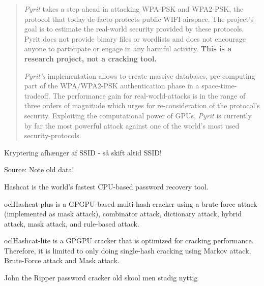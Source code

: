 \documentclass[20pt,landscape,a4paper,footrule]{foils}
\begin{document}

\begin{quote}
\emph{Pyrit} takes a step ahead in attacking WPA-PSK and WPA2-PSK, the protocol that today de-facto protects public WIFI-airspace. The project's goal is to estimate the real-world security provided by these protocols. Pyrit does not provide binary files or wordlists and does not encourage anyone to participate or engage in any harmful activity. {\bf This is a research project, not a cracking tool.}

\emph{Pyrit's} implementation allows to create massive databases, pre-computing part of the WPA/WPA2-PSK authentication phase in a space-time-tradeoff. The performance gain for real-world-attacks is in the range of three orders of magnitude which urges for re-consideration of the protocol's security. Exploiting the computational power of GPUs, \emph{Pyrit} is currently by far the most powerful attack against one of the world's most used security-protocols.
\end{quote}

\begin{list1}
\item Kryptering afhænger af SSID - så skift altid SSID!
\item {}
\end{list1}



Source:  Note old data!


\begin{list2}
\item Hashcat is the world's fastest CPU-based password recovery tool.
\item oclHashcat-plus is a GPGPU-based multi-hash cracker using a brute-force attack (implemented as mask attack), combinator attack, dictionary attack, hybrid attack, mask attack, and rule-based attack.
\item oclHashcat-lite is a GPGPU cracker that is optimized for cracking performance. Therefore, it is limited to only doing single-hash cracking using Markov attack, Brute-Force attack and Mask attack.
\item John the Ripper password cracker old skool men stadig nyttig
\end{list2}
\end{document}
